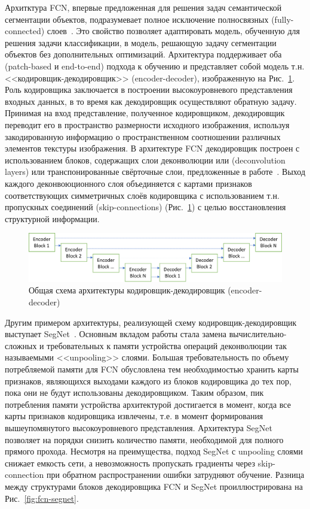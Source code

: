 Архитктура FCN, впервые предложенная для решения задач семантической сегментации объектов, подразумевает полное исключение полносвязных (fully-connected) слоев~\cite{shelhamer_2017}. Это свойство позволяет адаптировать модель, обученную для решения задачи классификации, в модель, решающую задачу сегментации объектов без дополнительных оптимизаций. Архитектура поддерживает оба (patch-based и end-to-end) подхода к обучению и представляет собой модель т.н. <<кодировщик-декодировщик>> (encoder-decoder), изображенную на Рис.~\ref{fig:encoder-decoder-architecture}. Роль кодировщика заключается в построении высокоуровневого представления входных данных, в то время как декодировщик осуществляют обратную задачу. Принимая на вход представление, полученное кодировщиком, декодировщик переводит его в пространство размерности исходного изображения, используя закодированную информацию о пространственном соотношении различных элементов текстуры изображения.
В архитектуре FCN декодировщик построен с использованием блоков, содержащих слои деконволюции или (deconvolution layers) или транспонированные свёрточные слои, предложенные в работе~\cite{zeiler_2011}.
Выход каждого деконвоюционного слоя объединяется с картами признаков соответствующих симметричных слоёв кодировщика с использованием т.н. пропускных соединений (skip-connections) (Рис.~\ref{fig:encoder-decoder-architecture}) с целью восстановления структурной информации.

\begin{figure}[t!]
	\centering
	\includegraphics[width=0.95\columnwidth]{pictures/dec_enc.png}
	\caption{Общая схема архитектуры кодировщик-декодировщик (encoder-decoder)}
	\label{fig:encoder-decoder-architecture}
\end{figure}

Другим примером архитектуры, реализующей схему кодировщик-декодировщик выступает SegNet~\cite{badrinarayanan_2017}. Основным вкладом работы стала замена вычислительно-сложных и требовательных к памяти устройства операций деконволюции так называемыми <<unpooling>> слоями. Большая требовательность по объему потребляемой памяти для FCN обусловлена тем необходимостью хранить карты признаков, являющихся выходами каждого из блоков кодировщика до тех пор, пока они не будут использованы декодировщиком. Таким образом, пик потребления памяти устройства архитектурой достигается в момент, когда все карты признаков кодировщика извлечены, т.е. в момент формирования вышеупомянутого высокоуровневого представления. Архитектура SegNet позволяет на порядки снизить количество памяти, необходимой для полного прямого прохода. Несмотря на преимущества, подход SegNet с unpooling слоями снижает емкость сети, а невозможность пропускать градиенты через skip-connection при обратном распространении ошибки затрудняют обучение. Разница между структурами блоков декодировщика FCN и SegNet проиллюстрирована на Рис.~\ref{fig:fcn-segnet}.

